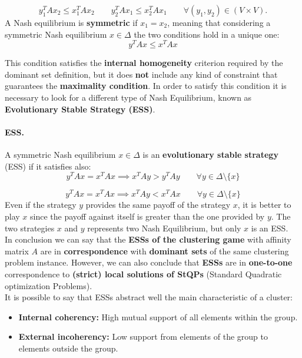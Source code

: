 $$y_1^TAx_2 \leq x_1^TAx_2 \qquad y_2^TAx_1 \leq x_2^TAx_1 \qquad \forall (y_1,y_2) \in (V\times V).$$ 
A Nash equilibrium is \textbf{symmetric} if $x_1 = x_2$, meaning that considering a symmetric Nash equilibrium $x \in \Delta$ the two conditions hold in a unique one:
$$y^TAx \leq x^TAx$$

This condition satisfies the \textbf{internal homogeneity} criterion required by the dominant set definition, but it does \textbf{not} include any kind of constraint that guarantees the \textbf{maximality condition}. In order to satisfy this condition it is necessary to look for a different type of Nash Equilibrium, known as \textbf{Evolutionary Stable Strategy (ESS)}. 

\paragraph{ESS.} A symmetric Nash equilibrium $x\in \Delta$ is an \textbf{evolutionary stable strategy} (ESS) if it satisfies also:
$$y^TAx = x^TAx \implies x^TAy > y^TAy \qquad \forall y \in \Delta\setminus\{x\}$$

$$y^TAx = x^TAx \implies x^TAy < x^TAx \qquad \forall y \in \Delta\setminus\{x\}$$
Even if the strategy $y$ provides the same payoff of the strategy $x$, it is better to play $x$ since the payoff against itself is greater than the one provided by $y$. The two strategies $x$ and $y$ represents two Nash Equilibrium, but only $x$ is an ESS.\\
In conclusion we can say that the \textbf{ESSs of the clustering game} with affinity matrix $A$ are in \textbf{correspondence} with \textbf{dominant sets} of the same clustering problem instance. However, we can also conclude that \textbf{ESSs} are in \textbf{one-to-one} correspondence to \textbf{(strict) local solutions of StQPs} (Standard Quadratic optimization Problems).\\
It is possible to say that ESSs abstract well the main characteristic of a cluster:
\begin{itemize}
	\item \textbf{Internal coherency:} High mutual support of all elements within the group.
	\item \textbf{External incoherency:} Low support from elements of the group to elements outside the group.
\end{itemize}

